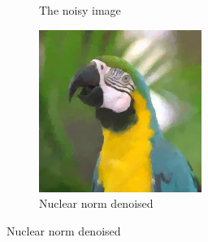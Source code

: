 \documentclass{article}
\begin{document}
\begin{figure}[ht]
\begin{subfigure}[b]{0.24\textwidth}
        \caption{The noisy image}
        \label{fig:noisy_colour}
    \end{subfigure}
    \begin{subfigure}[b]{0.24\textwidth}
        \centering
        \includegraphics[width=\textwidth]{../images/TNVdenoised_colour.png}
        \caption{Nuclear norm denoised}
        \label{fig:TNVdenoised_colour}
    \end{subfigure}
    
    \vspace{.3cm}
    

\end{figure}
\end{document}
